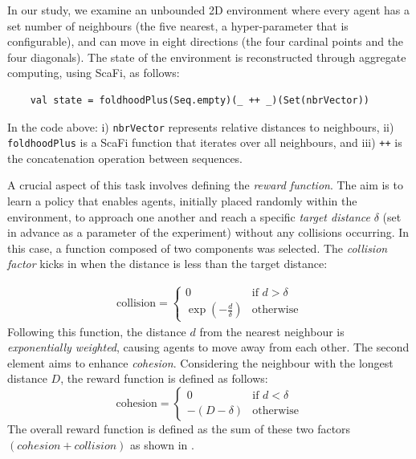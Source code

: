 \documentclass[12pt,a4paper,openright,twoside]{book}
\begin{document}
In our study, we examine an unbounded 2D environment where every agent has a set number of neighbours 
    (the five nearest, a hyper-parameter that is configurable), and can move in eight directions 
    (the four cardinal points and the four diagonals). The state of the environment is reconstructed 
    through aggregate computing, using ScaFi, as follows:
\begin{lstlisting}
    val state = foldhoodPlus(Seq.empty)(_ ++ _)(Set(nbrVector))
\end{lstlisting}    
In the code above: 
    i) \texttt{nbrVector} represents relative distances to neighbours, 
    ii) \texttt{foldhoodPlus} is a ScaFi function that iterates over all neighbours, and
    iii) \texttt{++} is the concatenation operation between sequences.
 
A crucial aspect of this task involves defining the \emph{reward function}. 
    The aim is to learn a policy that enables agents, initially placed randomly within the environment, 
    to approach one another and reach a specific \emph{target distance} $\delta$ (set in advance as a parameter of the 
    experiment) without any collisions occurring. In this case, a function composed of two components 
    was selected. The \emph{collision factor} kicks in when the distance is less than the target distance:

    \begin{equation}
        \label{eq:collision-factor}
        \begin{split}
            \text{collision} = \begin{cases}
                0 & \text{if } d > \delta \\
                \exp\left(-\frac{d}{\delta}\right) & \text{otherwise}
            \end{cases}
        \end{split}
    \end{equation}
    Following this function, the distance $d$ from the nearest neighbour is \emph{exponentially weighted}, 
    causing agents to move away from each other.
    The second element aims to enhance \emph{cohesion}. Considering the neighbour with the longest distance $D$, 
    the reward function is defined as follows:
    \begin{equation}
        \text{cohesion} = \begin{cases}
            0 & \text{if } d < \delta \\
            -(D - \delta) & \text{otherwise}
        \end{cases}
    \end{equation}
    The overall reward function is defined as the sum of these two factors $(cohesion + collision)$ as shown in .
\end{document}
